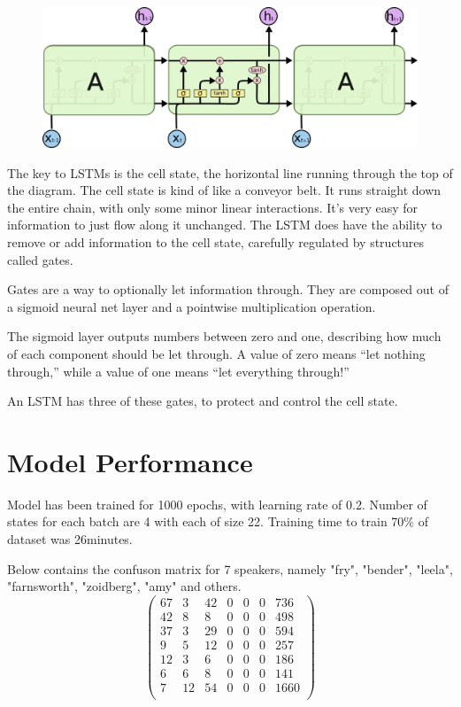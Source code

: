\documentclass[BTech]{srmuthesis}
\begin{document}
\begin{figure}[h]
\includegraphics[scale=0.4]{LSTM3-chain.png}
\centering
\end{figure}

The key to LSTMs is the cell state, the horizontal line running through the top of the diagram.
The cell state is kind of like a conveyor belt. It runs straight down the entire chain, with only some minor linear interactions. It’s very easy for information to just flow along it unchanged. The LSTM does have the ability to remove or add information to the cell state, carefully regulated by structures called gates.

Gates are a way to optionally let information through. They are composed out of a sigmoid neural net layer and a pointwise multiplication operation.

The sigmoid layer outputs numbers between zero and one, describing how much of each component should be let through. A value of zero means “let nothing through,” while a value of one means “let everything through!”

An LSTM has three of these gates, to protect and control the cell state.

\section{Model Performance}

Model has been trained for 1000 epochs, with learning rate of 0.2. Number of states for each batch are 4 with each of size 22. Training time to train 70\% of dataset was 26minutes.


Below contains the confuson matrix for 7 speakers, namely "fry", "bender", "leela", "farnsworth", "zoidberg", "amy" and others. 
$$\begin{pmatrix}
67&3&42&0&0&0&736\\
42&8 &8&0&0&0&498\\
37&3&29&0&0&0&594\\
9&5&12&0&0&0&257\\
12&3&6&0&0&0&186\\
6&6&8&0&0&0&141\\
7&12&54&0&0&0&1660\\
\end{pmatrix}$$
\end{document}
